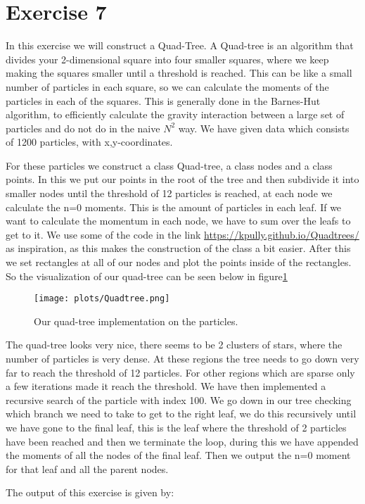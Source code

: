 \section{Exercise 7}
In this exercise we will construct a Quad-Tree. A Quad-tree is an algorithm that divides your 2-dimensional square into four smaller squares, where we keep making the squares smaller until a threshold is reached. This can be like a small number of particles in each square, so we can calculate the moments of the particles in each of the squares. This is generally done in the Barnes-Hut algorithm, to efficiently calculate the gravity interaction between a large set of particles and do not do in the naive $N^2$ way. We have given data which consists of 1200 particles, with x,y-coordinates.

For these particles we construct a class Quad-tree, a class nodes and a class points. In this we put our points in the root of the tree and then subdivide it into smaller nodes until the threshold of 12 particles is reached, at each node we calculate the n=0 moments. This is the amount of particles in each leaf. If we want to calculate the momentum in each node, we have to sum over the leafs to get to it. We use some of the code in the link \href{https://kpully.github.io/Quadtrees/}{https://kpully.github.io/Quadtrees/} as inspiration, as this makes the construction of the class a bit easier. After this we set rectangles at all of our nodes and plot the points inside of the rectangles. So the visualization of our quad-tree can be seen below in figure\ref{quadtree}

\begin{figure}[h]
   \centering
   \texttt{[image: plots/Quadtree.png]}
      \caption{Our quad-tree implementation on the particles.}
    \label{quadtree}
\end{figure}

The quad-tree looks very nice, there seems to be 2 clusters of stars, where the number of particles is very dense. At these regions the tree needs to go down very far to reach the threshold of 12 particles. For other regions which are sparse only a few iterations made it reach the threshold.
We have then implemented a recursive search of the particle with index 100. We go down in our tree checking which branch we need to take to get to the right leaf, we do this recursively until we have gone to the final leaf, this is the leaf where the threshold of 2 particles have been reached and then we terminate the loop, during this we have appended the moments of all the nodes of the final leaf. Then we output the n=0 moment for that leaf and all the parent nodes.


The output of this exercise is given by:


